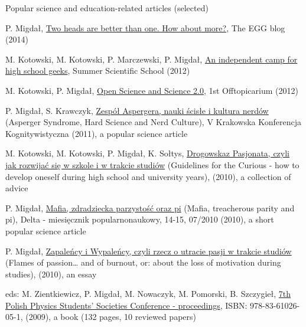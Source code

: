 \documentclass[margin,line]{resume}
\begin{document}
\begin{resume}
    Popular science and education-related articles (selected)
    \begin{list2}
        \item P. Migdał, \href{http://egtheory.wordpress.com/2014/01/30/two-heads-are-better-than-one-how-about-more/}{Two heads are better than one. How about more?}, The EGG blog (2014)
        \item M. Kotowski, M. Kotowski, P. Marczewski, P. Migdał, \href{http://warsztatywww.wikidot.com/en:indie-camp-for-hs-geeks}{An independent camp for high school geeks}, Summer Scientific School (2012)
        \item M. Kotowski, P. Migdał, \href{http://offtopicarium.wikidot.com/v1:open-science-2-0}{Open Science and Science 2.0}, 1st Offtopicarium (2012)
        \item P. Migdał, S. Krawczyk, \href{http://migdal.wikidot.com/local--files/nerdowska-duma/Migdal_Krawczyk__Zespol_Aspergera_preprint_after_vkkk.pdf}{Zespół Aspergera, nauki ścisłe i kultura nerdów} (Asperger Syndrome, Hard Science and Nerd Culture), V Krakowska Konferencja Kognitywistyczna (2011), a popular science article
		\item M. Kotowski, M. Kotowski, P. Migdał, K. Sołtys, \href{http://warsztatywww.wikidot.com/drogowskaz-pasjonata}{Drogowskaz Pasjonata, czyli jak rozwijać się w szkole i w trakcie studiów} (Guidelines for the Curious - how to develop oneself during high school and university years), (2010), a collection of advice
		\item P. Migdał, \href{http://www.mimuw.edu.pl/delta/artykuly/delta2010-07/2010-07-6.pdf}{Mafia, zdradziecka parzystość oraz pi} (Mafia, treacherous parity and pi), Delta - miesięcznik popularnonaukowy, 14-15, 07/2010 (2010), a short popular science article
		\item P. Migdał, \href{http://migdal.wikidot.com/zapalency-i-wypalency}{Zapaleńcy i Wypaleńcy, czyli rzecz o utracie pasji w trakcie studiów} (Flames of passion… and of burnout, or: about the loss of motivation during studies), (2010), an essay
		\item eds: M. Zientkiewicz, P. Migdał, M. Nowaczyk, M. Pomorski, B. Szczygieł, \href{http://skfiz.fuw.edu.pl/vii-osknf:proceedings}{7th Polish Physics Students' Societies Conference - proceedings}, ISBN: 978-83-61026-05-1, (2009), a book (132 pages, 10 reviewed papers)
    \end{list2}




\end{resume}
\end{document}
